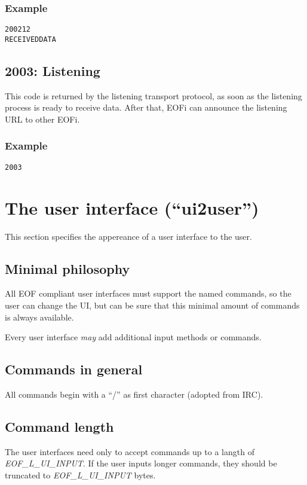 \documentclass[12pt,a4paper]{book}
\begin{document}
\subsubsection{Example}
\begin{verbatim}
200212
RECEIVEDDATA
\end{verbatim}
\subsection{2003: Listening}
This code is returned by the listening transport protocol, as soon as the
listening process is ready to receive data. After that, EOFi can announce
the listening URL to other EOFi.
\subsubsection{Example}
\begin{verbatim}
2003
\end{verbatim}
\section{The user interface ("`ui2user"')}
This section specifies the appereance of a user interface to the user.
\subsection{Minimal philosophy}
All EOF compliant user interfaces must support the named commands, so the
user can change the UI, but can be sure that this minimal amount of
commands is always available.

Every user interface \emph{may} add additional input methods or commands.
\subsection{Commands in general}
All commands begin with a "`/"' as first character (adopted from IRC).
\subsection{Command length}
The user interfaces need only to accept commands up to a langth of
\emph{EOF\_L\_UI\_INPUT}.
If the user inputs longer commands, they should be truncated
to \emph{EOF\_L\_UI\_INPUT} bytes.
\end{document}
